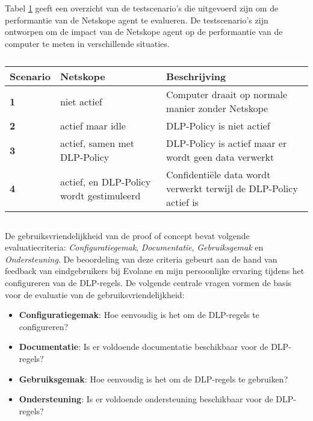 \subsubsection{}
\label{sec:testscenario's}

Tabel \ref{tab:test-scenarios-performance} geeft een overzicht van de testscenario's die uitgevoerd zijn om de performantie van de Netskope agent te evalueren. 
De testscenario's zijn ontworpen om de impact van de Netskope agent op de performantie van de computer te meten in verschillende situaties. 

\begin{table}[h]
    \centering
    \small
    \begin{tabular}{p{2cm} p{6cm} p{8cm}}
        \toprule
        \textbf{Scenario} & \textbf{Netskope} & \textbf{Beschrijving} \\
        \midrule
        \textbf{1} & niet actief & Computer draait op normale manier zonder Netskope \\
        \textbf{2} & actief maar idle & DLP-Policy is niet actief \\
        \textbf{3} & actief, samen met DLP-Policy & DLP-Policy is actief maar er wordt geen data verwerkt \\
        \textbf{4} & actief, en DLP-Policy wordt gestimuleerd & Confidentiële data wordt verwerkt terwijl de DLP-Policy actief is \\
        \bottomrule
    \end{tabular}
    \caption{}
    \label{tab:test-scenarios-performance}
\end{table}


\subsection{}
\label{sec:gebruiksvriendelijkheid}

De gebruiksvriendelijkheid van de proof of concept bevat volgende evaluatiecriteria: 
\textit{Configuratiegemak}, \textit{Documentatie}, \textit{Gebruiksgemak} en \textit{Ondersteuning}. 
De beoordeling van deze criteria gebeurt aan de hand van feedback van eindgebruikers bij Evolane en mijn persoonlijke ervaring tijdens het configureren van de DLP-regels. 
De volgende centrale vragen vormen de basis voor de evaluatie van de gebruiksvriendelijkheid:

\begin{itemize}
    \item \textbf{Configuratiegemak}: Hoe eenvoudig is het om de DLP-regels te configureren?
    \item \textbf{Documentatie}: Is er voldoende documentatie beschikbaar voor de DLP-regels?
    \item \textbf{Gebruiksgemak}: Hoe eenvoudig is het om de DLP-regels te gebruiken?
    \item \textbf{Ondersteuning}: Is er voldoende ondersteuning beschikbaar voor de DLP-regels?
    \label{sec:gebruiksvriendelijkheid-criteria}
\end{itemize}

